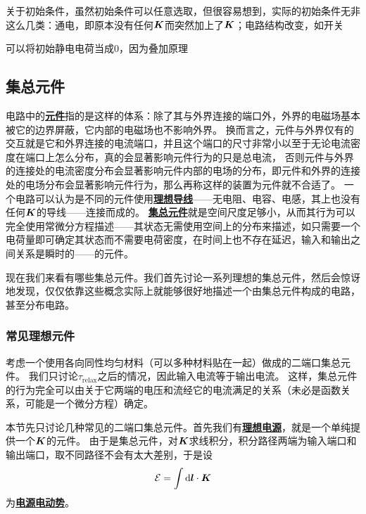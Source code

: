 \documentclass[UTF8, a4paper]{ctexart}
\newcommand*{\concept}[1]{\underline{\textbf{#1}}}
\begin{document}
关于初始条件，虽然初始条件可以任意选取，但很容易想到，实际的初始条件无非这么几类：通电，即原本没有任何$\vb*{K}$而突然加上了$\vb*{K}$；电路结构改变，如开关


可以将初始静电电荷当成0，因为叠加原理 %

\subsection{集总元件}

电路中的\concept{元件}指的是这样的体系：除了其与外界连接的端口外，外界的电磁场基本被它的边界屏蔽，它内部的电磁场也不影响外界。
换而言之，元件与外界仅有的交互就是它和外界连接的电流端口，并且这个端口的尺寸非常小以至于无论电流密度在端口上怎么分布，真的会显著影响元件行为的只是总电流，
否则元件与外界的连接处的电流密度分布会显著影响元件内部的电场的分布，即元件和外界的连接处的电场分布会显著影响元件行为，那么再称这样的装置为元件就不合适了。
一个电路可以认为是不同的元件使用\concept{理想导线}——无电阻、电容、电感，其上也没有任何$\vb*{K}$的导线——连接而成的。
\concept{集总元件}就是空间尺度足够小，从而其行为可以完全使用常微分方程描述——其状态无需使用空间上的分布来描述，如只需要一个电荷量即可确定其状态而不需要电荷密度，在时间上也不存在延迟，输入和输出之间关系是瞬时的——的元件。

现在我们来看有哪些集总元件。我们首先讨论一系列理想的集总元件，然后会惊讶地发现，仅仅依靠这些概念实际上就能够很好地描述一个由集总元件构成的电路，甚至分布电路。

\subsubsection{常见理想元件}


考虑一个使用各向同性均匀材料（可以多种材料贴在一起）做成的二端口集总元件。
我们只讨论$\tau_\text{relax}$之后的情况，因此输入电流等于输出电流。
这样，集总元件的行为完全可以由关于它两端的电压和流经它的电流满足的关系（未必是函数关系，可能是一个微分方程）确定。

本节先只讨论几种常见的二端口集总元件。首先我们有\concept{理想电源}，就是一个单纯提供一个$\vb*{K}$的元件。
由于是集总元件，对$\vb*{K}$求线积分，积分路径两端为输入端口和输出端口，取不同路径不会有太大差别，于是设
\begin{equation}
    \mathcal{E} = \int \dd{\vb*{l}} \cdot \vb*{K}
\end{equation}
为\concept{电源电动势}。
\end{document}
